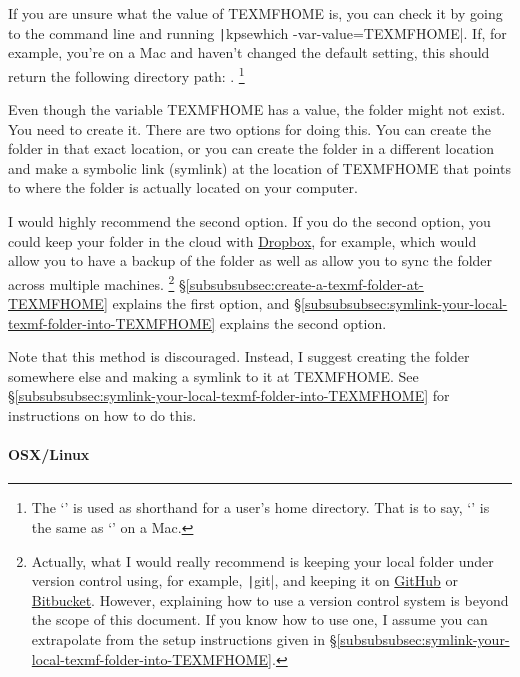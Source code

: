 If you are unsure what the value of TEXMFHOME is, you can check it by going to the command line and running \texttt|kpsewhich -var-value=TEXMFHOME|.
If, for example, you're on a Mac and haven't changed the default setting, this should return the following directory path: .%
\footnote{%
The `\Directory{\textasciitilde}' is used as shorthand for a user's home directory.
That is to say, `' is the same as `' on a Mac.%
}

Even though the variable TEXMFHOME has a value, the folder might not exist.
You need to create it.
There are two options for doing this.
You can create the folder in that exact location, or you can create the folder in a different location and make a symbolic link (symlink) at the location of TEXMFHOME that points to where the folder is actually located on your computer.

I would highly recommend the second option.
If you do the second option, you could keep your  folder in the cloud with \href{https://dropbox.com/}{Dropbox}, for example, which would allow you to have a backup of the folder as well as allow you to sync the folder across multiple machines.%
\footnote{%
Actually, what I would really recommend is keeping your local  folder under version control using, for example, \texttt|git|, and keeping it on \href{https://github.com/}{GitHub} or \href{https://bitbucket.org/}{Bitbucket}.
However, explaining how to use a version control system is beyond the scope of this document.
If you know how to use one, I assume you can extrapolate from the setup instructions given in \S\ref{subsubsubsec:symlink-your-local-texmf-folder-into-TEXMFHOME}.%
}
\S\ref{subsubsubsec:create-a-texmf-folder-at-TEXMFHOME} explains the first option, and \S\ref{subsubsubsec:symlink-your-local-texmf-folder-into-TEXMFHOME} explains the second option.

\label{subsubsubsec:create-a-texmf-folder-at-TEXMFHOME}

Note that this method is discouraged.
Instead, I suggest creating the folder somewhere else and making a symlink to it at TEXMFHOME.
See \S\ref{subsubsubsec:symlink-your-local-texmf-folder-into-TEXMFHOME} for instructions on how to do this.

\paragraph{OSX/Linux}

